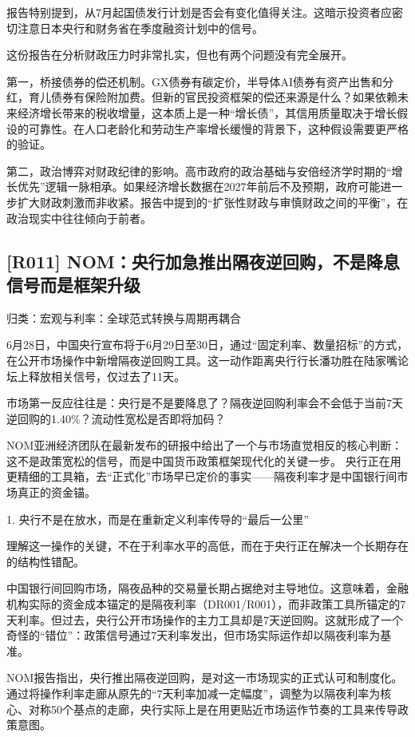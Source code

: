 \documentclass[11pt]{ctexart}
\begin{document}
报告特别提到，从7月起国债发行计划是否会有变化值得关注。这暗示投资者应密切注意日本央行和财务省在季度融资计划中的信号。

这份报告在分析财政压力时非常扎实，但也有两个问题没有完全展开。

第一，桥接债券的偿还机制。GX债券有碳定价，半导体AI债券有资产出售和分红，育儿债券有保险附加费。但新的官民投资框架的偿还来源是什么？如果依赖未来经济增长带来的税收增量，这本质上是一种“增长债”，其信用质量取决于增长假设的可靠性。在人口老龄化和劳动生产率增长缓慢的背景下，这种假设需要更严格的验证。

第二，政治博弈对财政纪律的影响。高市政府的政治基础与安倍经济学时期的“增长优先”逻辑一脉相承。如果经济增长数据在2027年前后不及预期，政府可能进一步扩大财政刺激而非收紧。报告中提到的“扩张性财政与审慎财政之间的平衡”，在政治现实中往往倾向于前者。

\subsection{[R011] NOM：央行加急推出隔夜逆回购，不是降息信号而是框架升级}
{\small\color{refgray}归类：宏观与利率：全球范式转换与周期再耦合}

6月28日，中国央行宣布将于6月29日至30日，通过“固定利率、数量招标”的方式，在公开市场操作中新增隔夜逆回购工具。这一动作距离央行行长潘功胜在陆家嘴论坛上释放相关信号，仅过去了11天。

市场第一反应往往是：央行是不是要降息了？隔夜逆回购利率会不会低于当前7天逆回购的1.40\%？流动性宽松是否即将加码？

NOM亚洲经济团队在最新发布的研报中给出了一个与市场直觉相反的核心判断：这不是政策宽松的信号，而是中国货币政策框架现代化的关键一步。 央行正在用更精细的工具箱，去“正式化”市场早已定价的事实——隔夜利率才是中国银行间市场真正的资金锚。

1. 央行不是在放水，而是在重新定义利率传导的“最后一公里”

理解这一操作的关键，不在于利率水平的高低，而在于央行正在解决一个长期存在的结构性错配。

中国银行间回购市场，隔夜品种的交易量长期占据绝对主导地位。这意味着，金融机构实际的资金成本锚定的是隔夜利率（DR001/R001），而非政策工具所锚定的7天利率。但过去，央行公开市场操作的主力工具却是7天逆回购。这就形成了一个奇怪的“错位”：政策信号通过7天利率发出，但市场实际运作却以隔夜利率为基准。

NOM报告指出，央行推出隔夜逆回购，是对这一市场现实的正式认可和制度化。通过将操作利率走廊从原先的“7天利率加减一定幅度”，调整为以隔夜利率为核心、对称50个基点的走廊，央行实际上是在用更贴近市场运作节奏的工具来传导政策意图。
\end{document}
